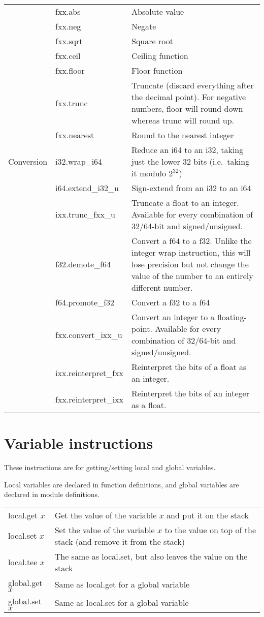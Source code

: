 \documentclass[10pt,a4paper]{article}
\begin{document}
\begin{xltabular}{\textwidth}{l>{\sffamily}lX}
& fxx.abs & Absolute value \\
& fxx.neg & Negate \\
& fxx.sqrt & Square root \\
& fxx.ceil & Ceiling function \\
& fxx.floor & Floor function \\
& fxx.trunc & Truncate (discard everything after the decimal point). For negative numbers, \textsf{floor} will round down whereas \textsf{trunc} will round up. \\
& fxx.nearest & Round to the nearest integer \\
\midrule
Conversion
& i32.wrap\_i64 & Reduce an \textsf{i64} to an \textsf{i32}, taking just the lower 32 bits (i.e.\ taking it modulo $2^{32}$) \\
& i64.extend\_i32\_u & Sign-extend from an \textsf{i32} to an \textsf{i64} \\
& ixx.trunc\_fxx\_u & Truncate a float to an integer. Available for every combination of 32/64-bit and signed/unsigned. \\
& f32.demote\_f64 & Convert a \textsf{f64} to a \textsf{f32}. Unlike the integer wrap instruction, this will lose precision but not change the value of the number to an entirely different number. \\
& f64.promote\_f32 & Convert a \textsf{f32} to a \textsf{f64} \\
& fxx.convert\_ixx\_u & Convert an integer to a floating-point. Available for every combination of 32/64-bit and signed/unsigned. \\
& ixx.reinterpret\_fxx & Reinterpret the bits of a float as an integer. \\
& fxx.reinterpret\_ixx & Reinterpret the bits of an integer as a float. \\
\bottomrule
\end{xltabular}

\section*{Variable instructions}

These instructions are for getting/setting local and global variables.

Local variables are declared in function definitions, and global variables are declared in module definitions.

\begin{xltabular}{\textwidth}{>{\sffamily}lX}
\toprule
local.get $x$ & Get the value of the variable $x$ and put it on the stack \\
local.set $x$ & Set the value of the variable $x$ to the value on top of the stack (and remove it from the stack) \\
local.tee $x$ & The same as \textsf{local.set}, but also leaves the value on the stack \\
global.get $x$ & Same as \textsf{local.get} for a global variable \\
global.set $x$ & Same as \textsf{local.set} for a global variable \\
\bottomrule
\end{xltabular}
\end{document}
